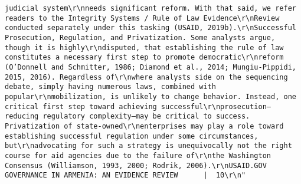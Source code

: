 \documentclass[
]{article}
\begin{document}
\begin{verbatim}
judicial system\r\nneeds significant reform. With that said, we refer readers to the Integrity Systems / Rule of Law Evidence\r\nReview conducted separately under this tasking (USAID, 2019b).\r\nSuccessful Prosecution, Regulation, and Privatization. Some analysts argue, though it is highly\r\ndisputed, that establishing the rule of law constitutes a necessary first step to promote democratic\r\nreform (O’Donnell and Schmitter, 1986; Diamond et al., 2014; Mungiu-Pippidi, 2015, 2016). Regardless of\r\nwhere analysts side on the sequencing debate, simply having numerous laws, combined with popular\r\nmobilization, is unlikely to change behavior. Instead, one critical first step toward achieving successful\r\nprosecution—reducing regulatory complexity—may be critical to success. Privatization of state-owned\r\nenterprises may play a role toward establishing successful regulation under some circumstances, but\r\nadvocating for such a strategy is unequivocally not the right course for aid agencies due to the failure of\r\nthe Washington Consensus (Williamson, 1993, 2000; Rodrik, 2006).\r\nUSAID.GOV                                                    GOVERNANCE IN ARMENIA: AN EVIDENCE REVIEW      |  10\r\n"                                                                                                                                                                                                                                                                                                                                                                                                                                                                                                                    

\end{verbatim}
\end{document}

